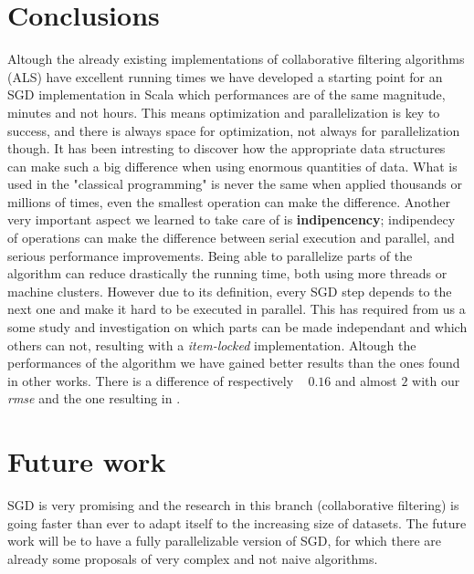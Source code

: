\documentclass{sig-alternate-05-2015}
\begin{document}
\section{Conclusions}

Altough the already existing implementations of collaborative
filtering algorithms (ALS) have excellent running times we
have developed a starting point for an SGD implementation in Scala
which performances are of the same magnitude, minutes and not hours.
This means optimization and parallelization is key to success, and
there is always space for optimization, not always for parallelization though.
It has been intresting to discover how the appropriate data structures can make
such a big difference when using enormous quantities of data. What is
used in the "classical programming" is never the same when applied thousands
or millions of times, even the smallest operation can make the difference.
Another very important aspect we learned to take care of is \textbf{indipencency};
indipendecy of operations can make the difference between serial execution and parallel,
and serious performance improvements. Being able to parallelize parts of the algorithm
can reduce drastically the running time, both using more threads or machine clusters.
However due to its definition, every SGD step depends to the next one and make it hard
to be executed in parallel. This has required from us a some study and investigation
on which parts can be made independant and which others can not, resulting with
a \textit{item-locked} implementation.
Altough the performances of the algorithm we have gained better results than
the ones found in other works. There is a difference of respectively ~ $0.16$ and  almost $2$ with our \textit{rmse}
and the one resulting in \cite{recommender}.

\section{Future work}

SGD is very promising and the research in this branch (collaborative filtering)
is going faster than ever to adapt itself to the increasing size of datasets.
The future work will be to have a fully parallelizable version of SGD, for which
there are already some proposals of very complex and not naive algorithms.

%

%
%
\appendix
\end{document}
